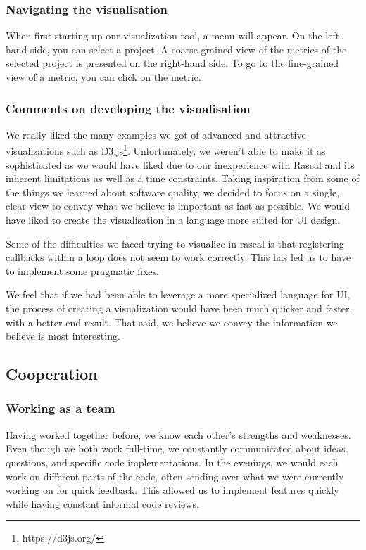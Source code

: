 \documentclass{article}
\begin{document}
\subsubsection{Navigating the visualisation}
When first starting up our visualization tool, a menu will appear. On the left-hand side, you can select a project. A coarse-grained view of the metrics of the selected project is presented on the right-hand side.  To go to the fine-grained view of a metric, you can click on the metric.

\subsubsection{Comments on developing the visualisation}
We really liked the many examples we got of advanced and attractive visualizations such as D3.js\footnote{https://d3js.org/}. Unfortunately, we weren't able to make it as sophisticated as we would have liked due to our inexperience with Rascal and its inherent limitations as well as a time constraints. Taking inspiration from some of the things we learned about software quality, we decided to focus on a single, clear view to convey what we believe is important as fast as possible. We would have liked to create the visualisation in a language more suited for UI design.

Some of the difficulties we faced trying to visualize in rascal is that registering callbacks within a loop does not seem to work correctly. This has led us to have to implement some pragmatic fixes.

We feel that if we had been able to leverage a more specialized language for UI, the process of creating a visualization would have been much quicker and faster, with a better end result. That said, we believe we convey the information we believe is most interesting.

\subsection{Cooperation}
\subsubsection{Working as a team}
Having worked together before, we know each other's strengths and weaknesses. Even though we both work full-time, we constantly communicated about ideas, questions, and specific code implementations. 
In the evenings, we would each work on different parts of the code, often sending over what we were currently working on for quick feedback. This allowed us to implement features quickly while having constant informal code reviews.
\end{document}

